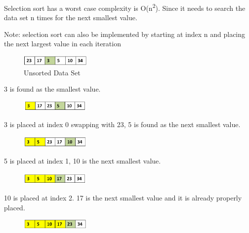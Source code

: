 Selection sort has a worst case complexity is O(n\textsuperscript{2}). Since it needs to search the data set n times for the next smallest value. \newline

Note: selection sort can also be implemented by starting at index n and placing the next largest value in each iteration
\begin{figure}[H]
\centering
\includegraphics[width=0.3\textwidth]{pictures/selection1.png}
\caption{Unsorted Data Set}
\label{fig:selection1}
\end{figure}

3 is found as the smallest value.

\begin{figure}[H]
\centering
\includegraphics[width=0.3\textwidth]{pictures/selection2.png}
\label{fig:selection2}
\end{figure}

3 is placed at index 0 swapping with 23, 5 is found as the next smallest value.

\begin{figure}[H]
\centering
\includegraphics[width=0.3\textwidth]{pictures/selection3.png}
\label{fig:selection3}
\end{figure}

5 is placed at index 1, 10 is the next smallest value.

\begin{figure}[H]
\centering
\includegraphics[width=0.3\textwidth]{pictures/selection4.png}
\label{fig:selection4}
\end{figure}

10 is placed at index 2. 17 is the next smallest value and it is already properly placed.

\begin{figure}[H]
\centering
\includegraphics[width=0.3\textwidth]{pictures/selection5.png}
\label{fig:selection5}
\end{figure}


